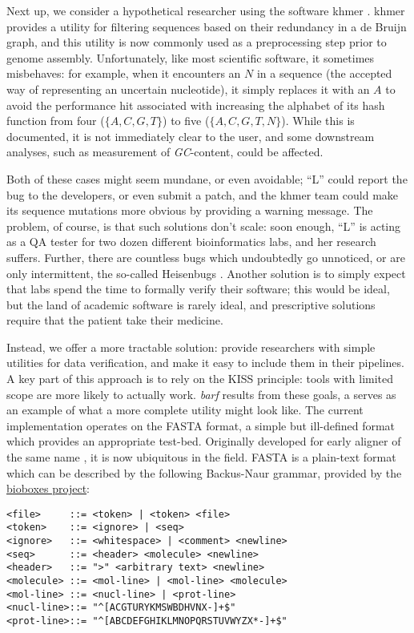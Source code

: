 \documentclass[12pt]{article} %
\newcommand{\quotes}[1]{``#1''}
\begin{document}
Next up, we consider a hypothetical researcher using the software khmer
\citep{crusoe_khmer_2014}. khmer provides a utility for filtering sequences based
on their redundancy in a de Bruijn graph, and this utility is now commonly used as a
preprocessing step prior to genome assembly. Unfortunately, like most scientific
software, it sometimes misbehaves: for example, when it encounters an $N$ in a 
sequence (the accepted way of representing an uncertain nucleotide), it simply replaces
it with an $A$ to avoid the performance hit associated with increasing the alphabet
of its hash function from four ($\{A,C,G,T\}$) to five ($\{A,C,G,T,N\}$). While this
is documented, it is not immediately clear to the user, and some downstream analyses,
such as measurement of \emph{GC}-content, could be affected. 

Both of these cases might seem mundane, or even avoidable; \quotes{L} could
report the bug to the developers, or even submit a patch, and the khmer team 
could make its sequence mutations more obvious by providing a warning message. 
The problem, of course, is
that such solutions don't scale: soon enough, \quotes{L} is acting as a QA tester
for two dozen different bioinformatics labs, and her research suffers. Further, there
are countless bugs which undoubtedly go unnoticed, or are only intermittent, the
so-called Heisenbugs \citep{gray_why_1986}. Another solution is to simply
expect that labs spend the time to formally verify their software; this would be ideal,
but the land of academic software is rarely ideal, and prescriptive solutions require
that the patient take their medicine.

Instead, we offer a more tractable solution: provide researchers with simple utilities
for data verification, and make it easy to include them in their pipelines. A key part
of this approach is to rely on the KISS principle: tools with limited scope are more
likely to actually work. \emph{barf} results from these goals, a serves as an example
of what a more complete utility might look like. The current implementation operates
on the FASTA format, a simple but ill-defined format which provides an appropriate
test-bed. Originally developed for early aligner of the same name
\citep{lipman_rapid_1985}, it is now ubiquitous in the field. FASTA is a plain-text
format which can be described by the following Backus-Naur grammar, provided
by the \href{https://github.com/bioboxes/rfc/blob/master/data-format/sequence.mkd}{bioboxes project}:

\begin{center}
\begin{verbatim}
<file>     ::= <token> | <token> <file>
<token>    ::= <ignore> | <seq>
<ignore>   ::= <whitespace> | <comment> <newline>
<seq>      ::= <header> <molecule> <newline>
<header>   ::= ">" <arbitrary text> <newline>
<molecule> ::= <mol-line> | <mol-line> <molecule>
<mol-line> ::= <nucl-line> | <prot-line>
<nucl-line>::= "^[ACGTURYKMSWBDHVNX-]+$"
<prot-line>::= "^[ABCDEFGHIKLMNOPQRSTUVWYZX*-]+$"
\end{verbatim}
\end{center}
\end{document}
